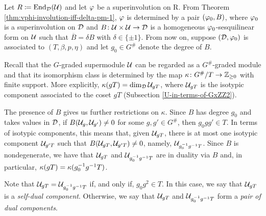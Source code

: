 Let $R \coloneqq \operatorname{End}_{\mathcal{D}} (\mathcal U)$ and let $\varphi$ be a superinvolution on R. 
From Theorem \ref{thm:vphi-involution-iff-delta-pm-1}, $\varphi$ is determined by a pair $(\varphi_0, B)$, where $\varphi_0$ is a superinvolution on $\mathcal{D}$ and $B\colon \mathcal U \times \mathcal U \to \mathcal{D}$ is a homogeneous $\varphi_0$-sesquilinear form on $\mathcal U$ such that $\overline B = \delta B$ with $\delta \in \{ \pm 1 \}$. 
From now on, suppose $(\mathcal{D}, \varphi_0)$ is associated to $(T, \beta, p, \eta)$ and let $g_0\in G^\#$ denote the degree of $B$. 

Recall that the $G$-graded supermodule $\mathcal U$ can be regarded as a $G^\#$-graded module 
and that its isomorphism class is determined by the map $\kappa\colon G^\#/T \to \mathbb{Z}_{\geq 0}$ with finite support. 
More explicitly, $\kappa (gT) = \dim_{\mathcal{D}} \mathcal U_{gT}$, where $\mathcal U_{gT}$ is the isotypic component associated to the coset $gT$ (Subsection \ref{U-in-terms-of-GxZZ2}).


The presence of $B$ gives us further restrictions on $\kappa$. 
Since $B$ has degree $g_0$ and takes values in $\mathcal{D}$, if $B(\mathcal U_{g}, \mathcal U_{g'}) \neq 0$ for some $g, g' \in G^\#$, then $g_0 g g' \in T$. 
In terms of isotypic components, this means that, given $\mathcal U_{g T}$, there is at most one isotypic component $\mathcal U_{g'T}$ such that $B(\mathcal U_{gT}, \mathcal U_{g'T}) \neq 0$, namely, $\mathcal U_{g_0^{-1} g^{-1} T}$. 
Since $B$ is nondegenerate, we have that $\mathcal U_{g T}$ and $\mathcal U_{g_0^{-1} g^{-1} T}$ are in duality via $B$ and, in particular, $\kappa(g T) = \kappa(g_0^{-1} g ^{-1} T)$. 

Note that $\mathcal U_{g T} = \mathcal U_{g_0^{-1} g^{-1} T}$ if, and only if, $g_0 g^2 \in T$. 
In this case, we say that $\mathcal U_{gT}$ is a \emph{self-dual component}. 
Otherwise, we say that $\mathcal U_{gT}$ and $\mathcal U_{g_0^{-1} g^{-1} T}$ form a \emph{pair of dual components}.

